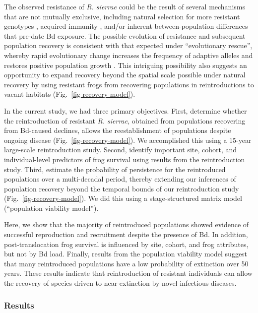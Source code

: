 \documentclass[
  letterpaper,
  DIV=11,
  numbers=noendperiod]{scrartcl}
\begin{document}
The observed resistance of \emph{R. sierrae} could be the result of
several mechanisms that are not mutually exclusive, including natural
selection for more resistant genotypes \citep{savage2016, grogan2018b},
acquired immunity \citep{grogan2018a}, and/or inherent
between-population differences that pre-date Bd exposure. The possible
evolution of resistance and subsequent population recovery is consistent
with that expected under ``evolutionary rescue'', whereby rapid
evolutionary change increases the frequency of adaptive alleles and
restores positive population growth \citep{carlson2014, searle2020}.
This intriguing possibility also suggests an opportunity to expand
recovery beyond the spatial scale possible under natural recovery by
using resistant frogs from recovering populations in reintroductions to
vacant habitats \citep{joseph2018, mendelson2019}
(Fig.~\ref{fig-recovery-model}).

In the current study, we had three primary objectives. First, determine
whether the reintroduction of resistant \emph{R. sierrae}, obtained from
populations recovering from Bd-caused declines, allows the
reestablishment of populations despite ongoing disease
(Fig.~\ref{fig-recovery-model}). We accomplished this using a 15-year
large-scale reintroduction study. Second, identify important site,
cohort, and individual-level predictors of frog survival using results
from the reintroduction study. Third, estimate the probability of
persistence for the reintroduced populations over a multi-decadal
period, thereby extending our inferences of population recovery beyond
the temporal bounds of our reintroduction study
(Fig.~\ref{fig-recovery-model}). We did this using a stage-structured
matrix model (``population viability model'').

Here, we show that the majority of reintroduced populations showed
evidence of successful reproduction and recruitment despite the presence
of Bd. In addition, post-translocation frog survival is influenced by
site, cohort, and frog attributes, but not by Bd load. Finally, results
from the population viability model suggest that many reintroduced
populations have a low probability of extinction over 50 years. These
results indicate that reintroduction of resistant individuals can allow
the recovery of species driven to near-extinction by novel infectious
diseases.

\subsubsection{Results}\label{results}
\end{document}
